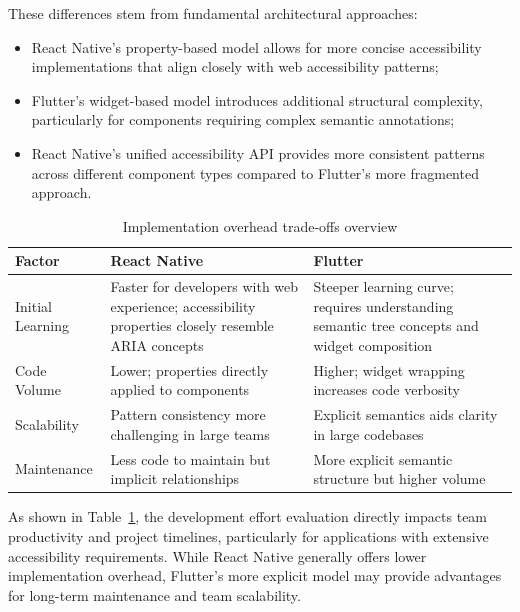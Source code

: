These differences stem from fundamental architectural approaches:

\begin{itemize}
    \item React Native's property-based model allows for more concise accessibility implementations that align closely with web accessibility patterns;
    
    \item Flutter's widget-based model introduces additional structural complexity, particularly for components requiring complex semantic annotations;
    
    \item React Native's unified accessibility API provides more consistent patterns across different component types compared to Flutter's more fragmented approach.
\end{itemize}

\begin{table}[ht]
\caption{Implementation overhead trade-offs overview}
\label{tab:implementation_tradeoffs}
\centering
\begin{tabular}{|p{2.5cm}|p{5.5cm}|p{5.5cm}|}
\hline
\textbf{Factor} & \textbf{React Native} & \textbf{Flutter} \\
\hline
Initial Learning & Faster for developers with web experience; accessibility properties closely resemble ARIA concepts & Steeper learning curve; requires understanding semantic tree concepts and widget composition \\
\hline
Code Volume & Lower; properties directly applied to components & Higher; widget wrapping increases code verbosity \\
\hline
Scalability & Pattern consistency more challenging in large teams & Explicit semantics aids clarity in large codebases \\
\hline
Maintenance & Less code to maintain but implicit relationships & More explicit semantic structure but higher volume \\
\hline
\end{tabular}
\end{table}

As shown in Table~\ref{tab:implementation_tradeoffs}, the development effort evaluation directly impacts team productivity and project timelines, particularly for applications with extensive accessibility requirements. While React Native generally offers lower implementation overhead, Flutter's more explicit model may provide advantages for long-term maintenance and team scalability.

